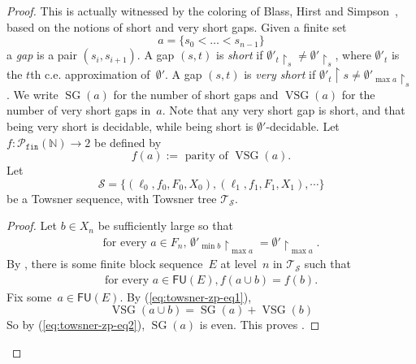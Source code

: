 \documentclass{article}
\def\Tc{\mathcal{T}}
\def\Sc{\mathcal{S}}
\newcommand{\uh}{\upharpoonright}
\newcommand{\NN}[0]{\mathbb{N}}
\newcommand{\SG}{\operatorname{SG}} %
\newcommand{\VSG}{\operatorname{VSG}} %
\newcommand{\Pfin}{\mathcal{P}_{\mathtt{fin}}}
\newcommand{\FU}[0]{\mathsf{FU}} %
\numberwithin{theorem}{section}
\newtheorem{proposition}[theorem]{Proposition}
\newtheorem{claim}{Claim}
\begin{document}
\begin{proof}
This is actually witnessed by the coloring of Blass, Hirst and Simpson~\cite{blassLogicalAnalysisTheorems1987}, based on the notions of short and very short gaps. 
Given a finite set 
$$a  = \{ s_0 < \dots < s_{n-1} \}$$
a \emph{gap} is a pair $(s_i, s_{i+1})$.
A gap $(s, t)$ is \emph{short} if $\emptyset'_t \uh_s \neq \emptyset' \uh_s$, where $\emptyset'_t$ is the $t$th c.e. approximation of~$\emptyset'$. A gap $(s, t)$ is \emph{very short} if $\emptyset'_t \uh s \neq \emptyset'_{\max a} \uh_s$. We write $\SG(a)$ for the number of short gaps and $\VSG(a)$ for the number of very short gaps in~$a$. 
Note that any very short gap is short, and that being very short is decidable, while being short is $\emptyset'$-decidable. Let $f : \Pfin(\NN) \to 2$ be defined by 
$$f(a) := \text{ parity of } \VSG(a).$$
Let
$$\Sc = \{ (\ell_0, f_0, F_0, X_0), (\ell_1, f_1, F_1, X_1), \cdots \}$$
be a Towsner sequence, with Towsner tree $\Tc_{\Sc}$.


\begin{proof}
Let $b \in X_n$ be sufficiently large so that 
\begin{align}\label{eq:towsner-zp-eq1}
    \text{for every $a \in F_n$, }  \emptyset'_{\min b} \uh_{\max a} = \emptyset' \uh_{\max a}.
\end{align}
By , there is some finite block sequence~$E$ at level~$n$ in $\Tc_{\Sc}$ such that
\begin{align}\label{eq:towsner-zp-eq2}
    \text{for every } a \in \FU(E), f(a \cup b) = f(b).
\end{align}
Fix some~$a \in \FU(E)$. By (\ref{eq:towsner-zp-eq1}),
$$
\VSG(a \cup b) = \SG(a) + \VSG(b)
$$
So by (\ref{eq:towsner-zp-eq2}), $\SG(a)$ is even. This proves .
\end{proof}


\end{proof}
\end{document}

